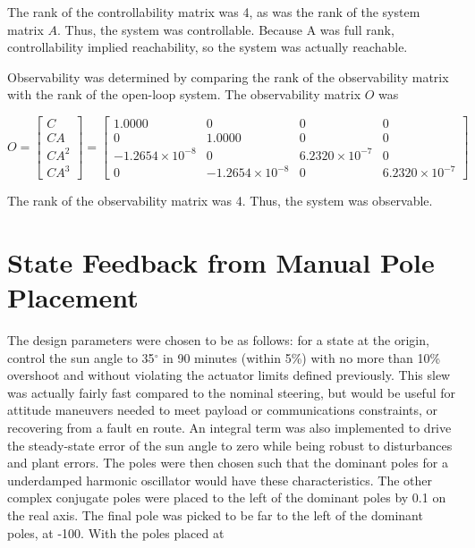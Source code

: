 \documentclass[]{aiaa-tc}%
\begin{document}
The rank of the controllability matrix was 4, as was the rank of the system matrix $A$. Thus, the system was controllable. Because A was full rank, controllability implied reachability, so the system was actually reachable.

	\vspace{5 mm}

	Observability was determined by comparing the rank of the observability matrix with the rank of the open-loop system. The observability matrix $O$ was

	\vspace{5 mm}

{\centering
 $O=\begin{bmatrix}
C\\ 
CA\\ 
CA^2\\ 
CA^3
\end{bmatrix}=\begin{bmatrix}
    1.0000 &             0 &            0 &           0\\ 
             0 &    1.0000 &            0 &           0\\ 
   -1.2654\times10^{-8} &             0 &   6.2320\times10^{-7} &           0\\ 
             0 &   -1.2654\times10^{-8} &            0 &  6.2320\times10^{-7}
\end{bmatrix}$\par}
	\vspace{5 mm}

The rank of the observability matrix was 4. Thus, the system was observable.

	\section{State Feedback from Manual Pole Placement}
	The design parameters were chosen to be as follows: for a state at the origin, control the sun angle to 35$^{\circ}$ in 90 minutes (within 5\%) with no more than 10\% overshoot and without violating the actuator limits defined previously. This slew was actually fairly fast compared to the nominal steering, but would be useful for attitude maneuvers needed to meet payload or communications constraints, or recovering from a fault en route. An integral term was also implemented to drive the steady-state error of the sun angle to zero while being robust to disturbances and plant errors. The poles were then chosen such that the dominant poles for a underdamped harmonic oscillator would have these characteristics. The other complex conjugate poles were placed to the left of the dominant poles by 0.1 on the real axis. The final pole was picked to be far to the left of the dominant poles, at -100. With the poles placed at
\end{document}
